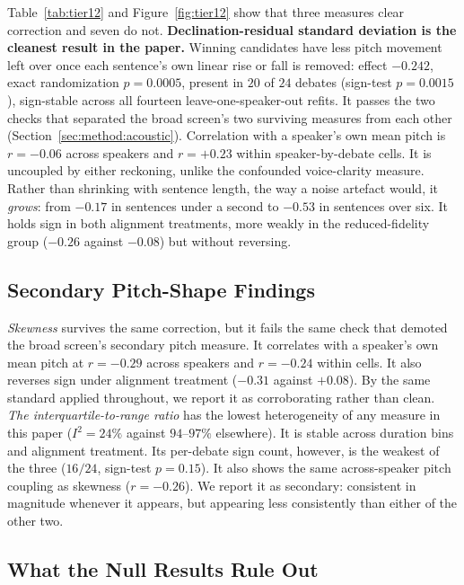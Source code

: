 \documentclass[pdflatex,sn-mathphys-num]{sn-jnl}%
\begin{document}
Table~\ref{tab:tier12} and Figure~\ref{fig:tier12} show that three measures
clear correction and seven do not. \textbf{Declination-residual standard
deviation is the cleanest result in the paper.} Winning candidates have less
pitch movement left over once each sentence's own linear rise or fall is
removed: effect $-0.242$, exact randomization $p = 0.0005$, present in $20$
of $24$ debates (sign-test $p = 0.0015$), sign-stable across all fourteen
leave-one-speaker-out refits. It passes the two checks that separated the
broad screen's two surviving measures from each other
(Section~\ref{sec:method:acoustic}). Correlation with a speaker's own mean
pitch is $r = -0.06$ across speakers and $r = +0.23$ within
speaker-by-debate cells. It is uncoupled by either reckoning, unlike the
confounded voice-clarity measure. Rather than shrinking with sentence length, the way a
noise artefact would, it \emph{grows}: from $-0.17$ in sentences under a
second to $-0.53$ in sentences over six. It holds sign in both alignment
treatments, more weakly in the reduced-fidelity group ($-0.26$ against
$-0.08$) but without reversing.

\subsection{Secondary Pitch-Shape Findings}
\label{sec:pitch:secondary}

\emph{Skewness} survives the same correction, but it fails the same check
that demoted the broad screen's secondary pitch measure. It correlates with
a speaker's own mean pitch at $r = -0.29$ across speakers and $r = -0.24$
within cells. It also reverses sign under alignment treatment ($-0.31$
against $+0.08$). By the same standard applied throughout, we report it as
corroborating rather than clean. \emph{The interquartile-to-range ratio} has
the lowest heterogeneity of any measure in this paper ($I^2 = 24\%$ against
$94$--$97\%$ elsewhere). It is stable across duration bins and alignment
treatment. Its per-debate sign count, however, is the weakest of the three
($16/24$, sign-test $p = 0.15$). It also shows the same across-speaker pitch
coupling as skewness ($r = -0.26$). We report it as secondary: consistent in
magnitude whenever it appears, but appearing less consistently than either
of the other two.

\subsection{What the Null Results Rule Out}
\label{sec:pitch:nulls}
\end{document}

